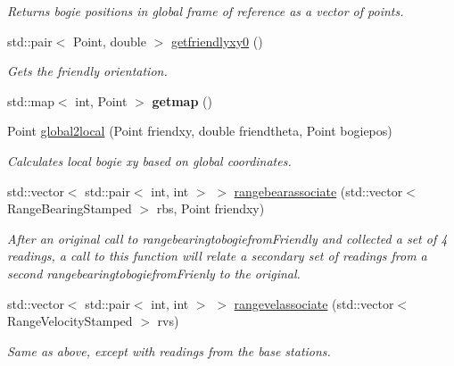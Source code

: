 \begin{DoxyCompactItemize}
\begin{DoxyCompactList}\small\item\em Returns bogie positions in global frame of reference as a vector of points. \end{DoxyCompactList}\item 
std\+::pair$<$ Point, double $>$ \hyperlink{classBogiepos_a8bdb83f90cf5381b9c620a7fbc12a2dc}{getfriendlyxy0} ()
\begin{DoxyCompactList}\small\item\em Gets the friendly orientation. \end{DoxyCompactList}\item 
\mbox{\label{classBogiepos_af5bf0a9ddc9540dcf8243f2041251949}} 
std\+::map$<$ int, Point $>$ {\bfseries getmap} ()
\item 
Point \hyperlink{classBogiepos_a91b69776c48fd215112e60e7f6cc55fa}{global2local} (Point friendxy, double friendtheta, Point bogiepos)
\begin{DoxyCompactList}\small\item\em Calculates local bogie xy based on global coordinates. \end{DoxyCompactList}\item 
std\+::vector$<$ std\+::pair$<$ int, int $>$ $>$ \hyperlink{classBogiepos_af1bd0da948d84ba0a294adbc10bcbdca}{rangebearassociate} (std\+::vector$<$ Range\+Bearing\+Stamped $>$ rbs, Point friendxy)
\begin{DoxyCompactList}\small\item\em After an original call to rangebearingtobogiefrom\+Friendly and collected a set of 4 readings, a call to this function will relate a secondary set of readings from a second rangebearingtobogiefrom\+Frienly to the original. \end{DoxyCompactList}\item 
std\+::vector$<$ std\+::pair$<$ int, int $>$ $>$ \hyperlink{classBogiepos_aaaee6b3fa6631cb2893fe1824c2320e3}{rangevelassociate} (std\+::vector$<$ Range\+Velocity\+Stamped $>$ rvs)
\begin{DoxyCompactList}\small\item\em Same as above, except with readings from the base stations. \end{DoxyCompactList}\end{DoxyCompactItemize}
